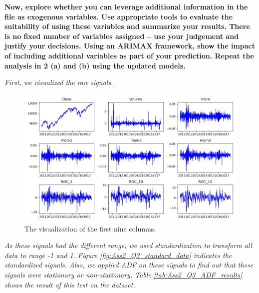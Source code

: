 \item \textbf{Now, explore whether you can leverage additional information in the file as exogenous variables. Use appropriate tools to evaluate the suitability of using these variables and summarize your results. There is no fixed number of variables assigned – use your judgement and justify your decisions.  Using an ARIMAX framework, show the impact of including additional variables as part of your prediction. Repeat the analysis in 2 (a) and (b) using the updated models.} 


\textit{First, we visualized the raw signals.} 

\begin{figure}[H]
    \centering
    \begin{minipage}[b]{1\textwidth}
        \includegraphics[width=\textwidth]{figures/Ass2/Ass2_Q3_raw_signal.png}
    \end{minipage}
    \caption{The visualization of the first nine columns.}
    \label{fig:Ass2_Q3_raw_signal}
\end{figure}




\textit{As these signals had the different range, we used standardization to transform all data to range -1 and 1. Figure \ref{fig:Ass2_Q3_standard_data} indicates the standardized signals. Also, we applied \gls{ADF} on these signals to find out that these signals were stationary or non-stationary. Table \ref{tab:Ass2_Q3_ADF_results} shows the result of this test on the dataset.}

